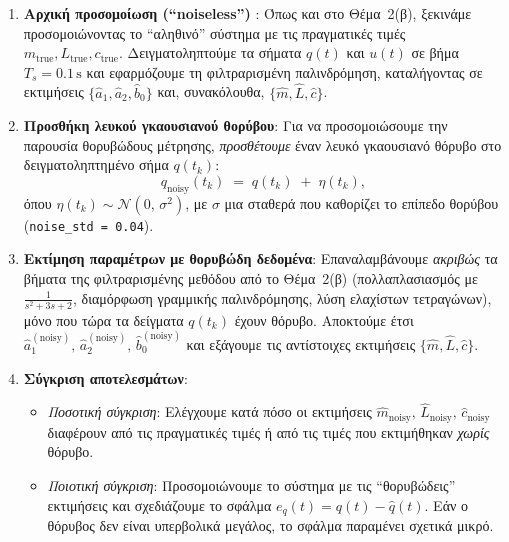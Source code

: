 \documentclass[a4paper,12pt]{report}
\newcommand{\en}{\selectlanguage{english}}
\newcommand{\gr}{\selectlanguage{greek}}
\begin{document}
\begin{enumerate}
    \item \textbf{Αρχική προσομοίωση \en (``noiseless'') \gr}: 
    Όπως και στο Θέμα~2(β), ξεκινάμε προσομοιώνοντας το ``αληθινό'' σύστημα με τις 
    πραγματικές τιμές $m_{\mathrm{true}}, L_{\mathrm{true}}, c_{\mathrm{true}}$. 
    Δειγματοληπτούμε τα σήματα $q(t)$ και $u(t)$ σε βήμα $T_s=0.1\,\mathrm s$ 
    και εφαρμόζουμε τη φιλτραρισμένη παλινδρόμηση, καταλήγοντας σε εκτιμήσεις 
    $\{\hat{a}_1,\hat{a}_2,\hat{b}_0\}$ και, συνακόλουθα, 
    $\{\hat{m},\hat{L},\hat{c}\}$.

    \item \textbf{Προσθήκη λευκού γκαουσιανού θορύβου}: 
    Για να προσομοιώσουμε την παρουσία θορυβώδους μέτρησης, 
    \emph{προσθέτουμε} έναν λευκό γκαουσιανό θόρυβο στο δειγματοληπτημένο σήμα $q(t_k)$:
    \[
    q_{\mathrm{noisy}}(t_k) \;=\; q(t_k) \;+\; \eta(t_k),
    \]
    όπου $\eta(t_k)\sim \mathcal{N}(0,\,\sigma^2)$, με $\sigma$ μια σταθερά που 
    καθορίζει το επίπεδο θορύβου \en (\texttt{noise\_std = 0.04})\gr.

    \item \textbf{Εκτίμηση παραμέτρων με θορυβώδη δεδομένα}:
    Επαναλαμβάνουμε \emph{ακριβώς} τα βήματα της φιλτραρισμένης μεθόδου από το Θέμα~2(β) 
    (πολλαπλασιασμός με $\tfrac{1}{s^2+3s+2}$, διαμόρφωση γραμμικής παλινδρόμησης, 
    λύση ελαχίστων τετραγώνων), μόνο που τώρα τα δείγματα $q(t_k)$ έχουν θόρυβο. 
    Αποκτούμε έτσι \(\hat{a}_1^{(\mathrm{noisy})},\,\hat{a}_2^{(\mathrm{noisy})},\,\hat{b}_0^{(\mathrm{noisy})}\) 
    και εξάγουμε τις αντίστοιχες εκτιμήσεις $\{\hat{m},\hat{L},\hat{c}\}$.

    \item \textbf{Σύγκριση αποτελεσμάτων}:
    \begin{itemize}
        \item \emph{Ποσοτική σύγκριση}: Ελέγχουμε κατά πόσο οι εκτιμήσεις 
        $\hat{m}_{\mathrm{noisy}},\,\hat{L}_{\mathrm{noisy}},\,\hat{c}_{\mathrm{noisy}}$ 
        διαφέρουν από τις πραγματικές τιμές ή από τις τιμές που εκτιμήθηκαν 
        \emph{χωρίς} θόρυβο. 
        \item \emph{Ποιοτική σύγκριση}: Προσομοιώνουμε το σύστημα με τις 
        ``θορυβώδεις'' εκτιμήσεις και σχεδιάζουμε το σφάλμα 
        \(\displaystyle e_q(t)=q(t)-\hat{q}(t)\). Εάν ο θόρυβος δεν είναι υπερβολικά μεγάλος, 
        το σφάλμα παραμένει σχετικά μικρό.
    \end{itemize}
\end{enumerate}
\end{document}
